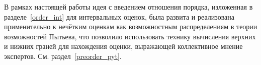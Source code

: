В рамках настоящей работы идея с введением отношения порядка, изложенная в разделе~\ref{order_int} для интервальных оценок, была развита и реализована применительно к нечётким оценкам как возможностным распределениям в теории возможностей Пытьева, что позволило использовать технику вычисления верхних и нижних граней для нахождения оценки, выражающей коллективное мнение экспертов. См. раздел~\ref{preorder_pyt}.

